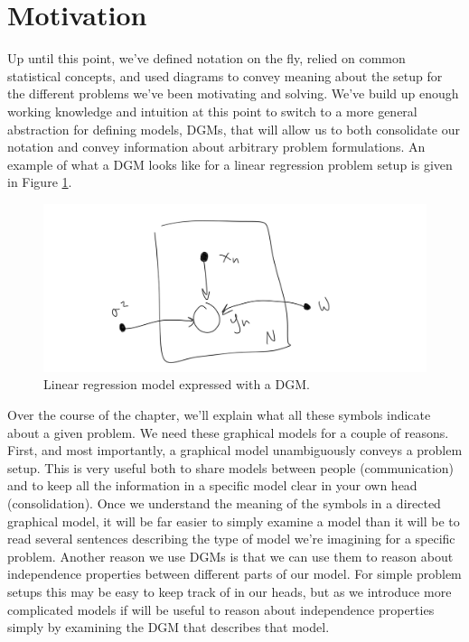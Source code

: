 \section{Motivation}
Up until this point, we've defined notation on the fly, relied on common statistical concepts, and used diagrams to convey meaning about the setup for the different problems we've been motivating and solving. We've build up enough working knowledge and intuition at this point to switch to a more general abstraction for defining models, DGMs, that will allow us to both consolidate our notation and convey information about arbitrary problem formulations. An example of what a DGM looks like for a linear regression problem setup is given in Figure \ref{fig:lin-reg-dgm}.
\begin{figure}
    \centering
    \includegraphics[width=0.5\paperwidth]{../GraphicalModels/fig/LinearRegressionDGM.png}
    \caption{Linear regression model expressed with a DGM.}
    \label{fig:lin-reg-dgm}
\end{figure}
Over the course of the chapter, we'll explain what all these symbols indicate about a given problem. We need these graphical models for a couple of reasons. First, and most importantly, a graphical model unambiguously conveys a problem setup. This is very useful both to share models between people (communication) and to keep all the information in a specific model clear in your own head (consolidation). Once we understand the meaning of the symbols in a directed graphical model, it will be far easier to simply examine a model than it will be to read several sentences describing the type of model we're imagining for a specific problem. Another reason we use DGMs is that we can use them to reason about independence properties between different parts of our model. For simple problem setups this may be easy to keep track of in our heads, but as we introduce more complicated models if will be useful to reason about independence properties simply by examining the DGM that describes that model.


